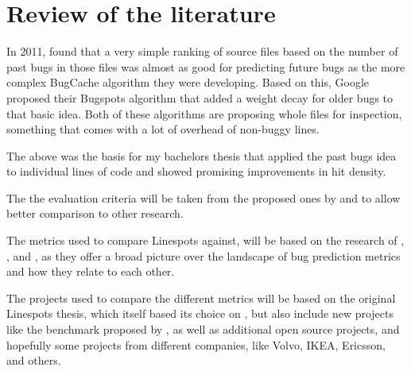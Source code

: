 \section{Review of the literature }

In 2011, \textcite{Rahman:2011:BIH:2025113.2025157} found that a very simple ranking of source files based on the number of past bugs in those files was almost as good for predicting future bugs as the more complex BugCache algorithm they were developing. Based on this, Google proposed their Bugspots algorithm \cite{bugspots} that added a weight decay for older bugs to that basic idea. Both of these algorithms are proposing whole files for inspection, something that comes with a lot of overhead of non-buggy lines.

The above was the basis for my bachelors thesis \cite{scholz2016line} that applied the past bugs idea to individual lines of code and showed promising improvements in hit density.

The the evaluation criteria will be taken from the proposed ones by \textcite{6035727} and \textcite{ARISHOLM20102} to allow better comparison to other research.

The metrics used to compare Linespots against, will be based on the research of \textcite{6035727}, \textcite{RADJENOVIC20131397}, and \textcite{5463279}, as they offer a broad picture over the landscape of bug prediction metrics and how they relate to each other.

The projects used to compare the different metrics will be based on the original Linespots thesis, which itself based its choice on \textcite{Rahman:2011:BIH:2025113.2025157}, but also include new projects like the benchmark proposed by \textcite{5463279}, as well as additional open source projects, and hopefully some projects from different companies, like Volvo, IKEA, Ericsson, and others.